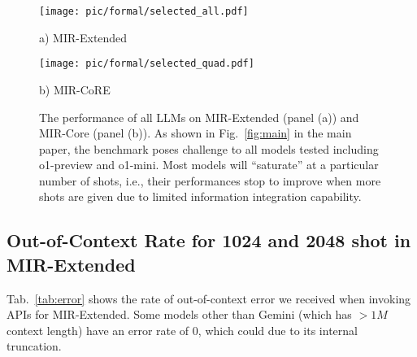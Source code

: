 \begin{figure}[ht]
    \centering
    \begin{minipage}[c]{0.4\linewidth}
        \centering
        \texttt{[image: pic/formal/selected\_all.pdf]}
        \caption*{a) MIR-Extended}
    \end{minipage}
    \hfill
    \begin{minipage}[c]{0.55\linewidth}
        \centering
        \texttt{[image: pic/formal/selected\_quad.pdf]}
        \vspace{0.5em}
        \caption*{b) MIR-CoRE}
    \end{minipage}
    
    \caption{The performance of all LLMs on MIR-Extended (panel (a)) and MIR-Core (panel (b)). As shown in Fig.~\ref{fig:main} in the main paper, the benchmark poses challenge to all models tested including o1-preview and o1-mini. Most models will ``saturate'' at a particular number of shots, i.e., their performances stop to improve when more shots are given due to limited information integration capability.}
    \label{fig:all_main}
\end{figure}

\subsection{Out-of-Context Rate for 1024 and 2048 shot in MIR-Extended}

Tab.~\ref{tab:error} shows the rate of out-of-context error we received when invoking APIs for MIR-Extended. Some models other than Gemini (which has $>1M$ context length) have an error rate of $0$, which could due to its internal truncation.

